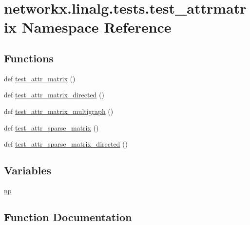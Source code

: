 \hypertarget{namespacenetworkx_1_1linalg_1_1tests_1_1test__attrmatrix}{}\section{networkx.\+linalg.\+tests.\+test\+\_\+attrmatrix Namespace Reference}
\label{namespacenetworkx_1_1linalg_1_1tests_1_1test__attrmatrix}
\subsection*{Functions}
\begin{DoxyCompactItemize}
\item 
def \hyperlink{namespacenetworkx_1_1linalg_1_1tests_1_1test__attrmatrix_a77cccd9f9fc8425144bcc73e4b09100e}{test\+\_\+attr\+\_\+matrix} ()
\item 
def \hyperlink{namespacenetworkx_1_1linalg_1_1tests_1_1test__attrmatrix_ae025d6c8d4f1f98e35e1c1dae4e09ee4}{test\+\_\+attr\+\_\+matrix\+\_\+directed} ()
\item 
def \hyperlink{namespacenetworkx_1_1linalg_1_1tests_1_1test__attrmatrix_ace954f4d7d17e65c3c357a3a5df1137f}{test\+\_\+attr\+\_\+matrix\+\_\+multigraph} ()
\item 
def \hyperlink{namespacenetworkx_1_1linalg_1_1tests_1_1test__attrmatrix_ae2a4ef06c467818789a7ae1ba6a5aca9}{test\+\_\+attr\+\_\+sparse\+\_\+matrix} ()
\item 
def \hyperlink{namespacenetworkx_1_1linalg_1_1tests_1_1test__attrmatrix_a05550cf7c8bbdf00f076d83e57870c86}{test\+\_\+attr\+\_\+sparse\+\_\+matrix\+\_\+directed} ()
\end{DoxyCompactItemize}
\subsection*{Variables}
\begin{DoxyCompactItemize}
\item 
\hyperlink{namespacenetworkx_1_1linalg_1_1tests_1_1test__attrmatrix_a71406b582c53aefece85b41239a95fe6}{np}
\end{DoxyCompactItemize}


\subsection{Function Documentation}
\mbox{\label{namespacenetworkx_1_1linalg_1_1tests_1_1test__attrmatrix_a77cccd9f9fc8425144bcc73e4b09100e}} 
